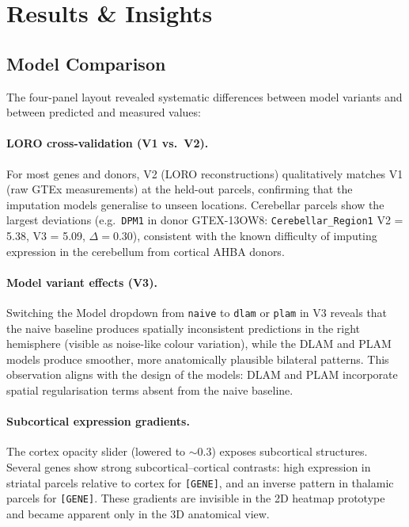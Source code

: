 \documentclass[11pt,letterpaper]{article}
\begin{document}
\section{Results \& Insights}
\label{sec:results}

\subsection{Model Comparison}

The four-panel layout revealed systematic differences between
model variants and between predicted and measured values:

\paragraph{LORO cross-validation (V1 vs.\ V2).}
For most genes and donors, V2 (LORO reconstructions) qualitatively
matches V1 (raw GTEx measurements) at the held-out parcels,
confirming that the imputation models generalise to unseen locations.
Cerebellar parcels show the largest deviations (e.g.\ \texttt{DPM1} in
donor GTEX-13OW8: \texttt{Cerebellar\_Region1} V2 = 5.38, V3 = 5.09,
$\Delta = 0.30$), consistent with the known difficulty of imputing
expression in the cerebellum from cortical AHBA donors.

\paragraph{Model variant effects (V3).}
Switching the Model dropdown from \texttt{naive} to \texttt{dlam}
or \texttt{plam} in V3 reveals that the naive baseline produces
spatially inconsistent predictions in the right hemisphere
(visible as noise-like colour variation), while the DLAM and PLAM
models produce smoother, more anatomically plausible bilateral
patterns.
This observation aligns with the design of the models:
DLAM and PLAM incorporate spatial regularisation terms absent from
the naive baseline.

\paragraph{Subcortical expression gradients.}
The cortex opacity slider (lowered to $\sim$0.3) exposes subcortical
structures.
Several genes show strong subcortical--cortical contrasts:
high expression in striatal parcels relative to cortex for \texttt{[GENE]},
and an inverse pattern in thalamic parcels for \texttt{[GENE]}.
These gradients are invisible in the 2D heatmap prototype and became
apparent only in the 3D anatomical view.
\end{document}
